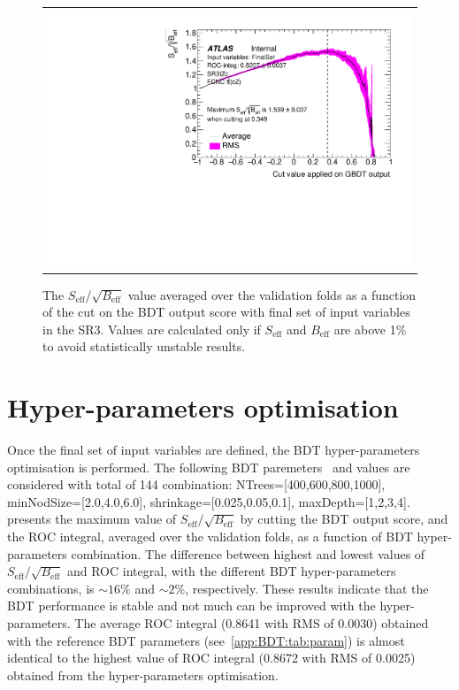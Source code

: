 \begin{figure}[!htbp]
	\centering
	\begin{tabular}{c}
		\includegraphics[width=.65\textwidth]{Chapters/CH5/figures/SR3_UsingSMT/BDT/FinalSet/CutEff_FinalSet}
	\end{tabular}
	\caption{ The $S_{\text{eff}}/\sqrt{B_{\text{eff}}}$ value averaged over the validation folds as a function of the cut on the BDT output score
		with final set of input variables in the SR3.
		Values are calculated only if $S_{\text{eff}}$ and $B_{\text{eff}}$ are above 1\% to avoid statistically unstable results.}
	\label{app:BDT:fig:SR3:CutEff}
\end{figure}

\section{Hyper-parameters optimisation}
Once the final set of input variables are defined, the BDT hyper-parameters optimisation is performed.
The following BDT paremeters~\cite{TMVA} and values are considered with total of 144 combination:
NTrees=[400,600,800,1000], minNodSize=[2.0,4.0,6.0], shrinkage=[0.025,0.05,0.1], maxDepth=[1,2,3,4].
~ presents the maximum value of $S_{\text{eff}}/\sqrt{B_{\text{eff}}}$ by cutting the BDT output score, and the ROC integral,
averaged over the validation folds, as a function of BDT hyper-parameters combination.
The difference between highest and lowest values of $S_{\text{eff}}/\sqrt{B_{\text{eff}}}$ and ROC integral,
with the different BDT hyper-parameters combinations, is $\sim16\%$ and $\sim2\%$, respectively.
These results indicate that the BDT performance is stable and not much can be improved with the hyper-parameters.
The average ROC integral (0.8641 with RMS of 0.0030) obtained with the reference BDT parameters (see~\cref{app:BDT:tab:param}) is almost identical to the highest value
of ROC integral (0.8672 with RMS of 0.0025) obtained from the hyper-parameters optimisation.

